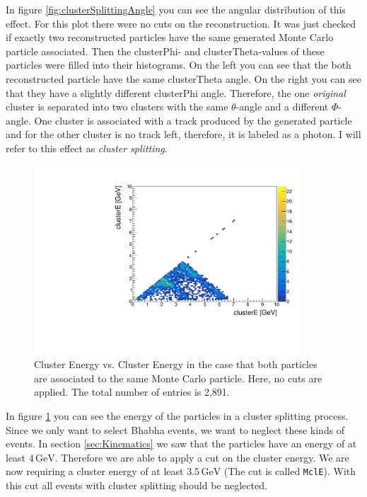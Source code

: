\documentclass[a4paper,11pt,twosided,final,german,openbib,pdftex,listof=totoc,bibliography=totoc]{scrbook}
\begin{document}
In figure \ref{fig:clusterSplittingAngle} you can see the angular distribution of this effect. For this plot there were no cuts on the reconstruction. It was just checked if exactly two reconstructed particles have the same generated Monte Carlo particle associated. Then the clusterPhi- and clusterTheta-values of these particles were filled into their histograms. On the left you can see that the both reconstructed particle have the same clusterTheta angle. On the right you can see that they have a slightly different clusterPhi angle. Therefore, the one \textit{original} cluster  is separated into two clusters with the same $\theta$-angle and a different $\Phi$-angle. One cluster is associated with a track produced by the generated particle and for the other cluster is no track left, therefore, it is labeled as a photon. I will refer to this effect as \textit{cluster splitting}.





\begin{figure}[h!]
	\centering
	\includegraphics[width=10cm]{AnhangPlots/EEdoubleMCE}
	\caption[Cluster Splitting Energy Distribution]{Cluster Energy vs. Cluster Energy in the case that both particles are associated to the same Monte Carlo particle. Here, no cuts are applied. The total number of entries is 2,891.}
	\label{fig:clusterSplittingE}
\end{figure}

In figure \ref{fig:clusterSplittingE} you can see the energy of the particles in a cluster splitting process. Since we only want to select Bhabha events, we want to neglect these kinds of events. In section \ref{sec:Kinematics} we saw that the particles have an energy of at least $4\,\textrm{GeV}$. Therefore we are able to apply a cut on the cluster energy. We are now requiring a cluster energy of at least $3.5\,\textrm{GeV}$ (The cut is called \texttt{MclE}). With this cut all events with cluster splitting should be neglected.
\end{document}
